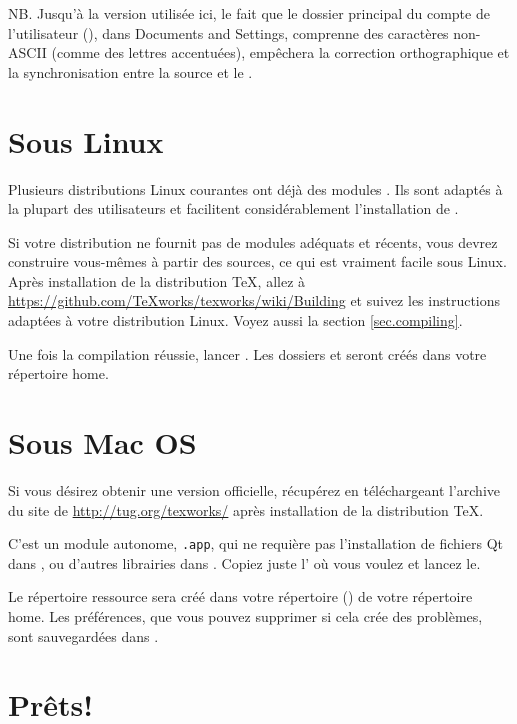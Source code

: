 NB. Jusqu'à la version utilisée ici, le fait que le dossier principal du compte de l'utilisateur (), dans \og Documents and Settings\fg, comprenne des caractères non-ASCII (comme des lettres accentuées), empêchera la correction orthographique et la synchronisation entre la source et le .

\section{Sous Linux}

Plusieurs distributions Linux courantes ont déjà des modules \Tw. Ils sont adaptés à la plupart des utilisateurs et facilitent considérablement l'installation de \Tw.

Si votre distribution ne fournit pas de modules adéquats et récents, vous devrez construire vous-mêmes \Tw{} à partir des sources, ce qui est vraiment facile sous Linux. Après installation de la distribution \TeX, allez à \url{https://github.com/TeXworks/texworks/wiki/Building} et suivez les instructions adaptées à votre distribution Linux. Voyez aussi la section \ref{sec.compiling}.

Une fois la compilation réussie, lancer \Tw{}. Les dossiers  et  seront créés dans votre répertoire home.

\section{Sous Mac OS}

Si vous désirez obtenir une version \og officielle\fg{}, récupérez \Tw{} en téléchargeant l'archive du site de \Tw{} \url{http://tug.org/texworks/} après installation de la distribution {\TeX}.

C'est un module autonome, \texttt{.app}, qui ne requière pas l'installation de fichiers Qt dans , ou d'autres librairies dans . Copiez juste l' où vous voulez et lancez le.

Le répertoire ressource \Tw{} sera créé dans votre répertoire  () de votre répertoire home. Les préférences, que vous pouvez supprimer si cela crée des problèmes, sont sauvegardées dans  .

\section{Prêts!}

